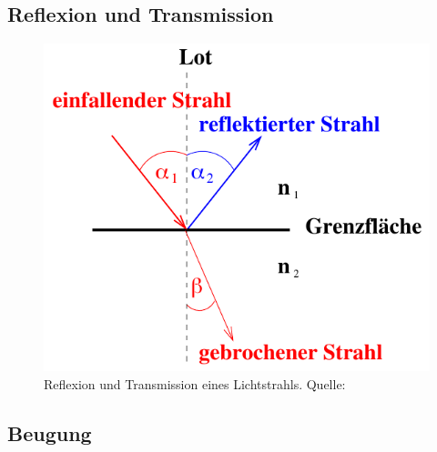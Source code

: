 \subsection{Reflexion und Transmission}
\label{sec:RefTrans}
\begin{figure}[H]
    \centering
    \includegraphics[scale = 0.5]{pictures/ReflexionTransmission.png}
    \caption{Reflexion und Transmission eines Lichtstrahls. Quelle: \cite{AP01}}
    \label{fig:reflexion}
\end{figure}

\subsection{Beugung}
\label{sec:beugung}